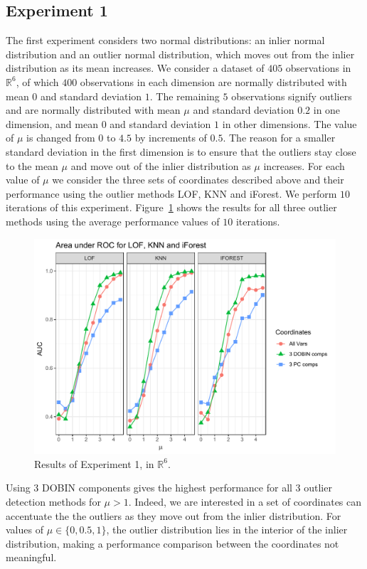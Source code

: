 \documentclass[a4paper,11pt]{article}
\begin{document}
\subsection{Experiment 1}
The first experiment considers two normal distributions: an  inlier normal distribution and an outlier normal distribution, which moves out from the inlier distribution as its mean increases. We consider a dataset of $405$ observations in $\mathbb{R}^6$, of which $400$ observations in each dimension are normally distributed with mean $0$ and standard deviation $1$. The remaining $5$ observations signify outliers and are normally distributed with mean $\mu$ and standard deviation $0.2$ in one dimension, and mean $0$ and standard deviation $1$ in other dimensions. The value of $\mu$ is changed from $0$ to $4.5$ by increments of $0.5$. The reason for a smaller standard deviation in the first dimension is to ensure that the outliers stay close to the mean $\mu$ and move out of the inlier distribution as $\mu$ increases. For each value of $\mu$ we consider the three sets of coordinates described above and their performance using the outlier methods LOF, KNN and iForest.  We perform $10$ iterations of this experiment. Figure~\ref{fig:Exp1} shows the results for all three  outlier methods using the average performance values of $10$ iterations. 

\begin{figure}[!ht]
	\centering
	\includegraphics[scale=0.5]{Exp1.pdf}
	\caption{Results of Experiment 1, in $\mathbb{R}^6$.}
	\label{fig:Exp1}
\end{figure} 

Using $3$ DOBIN components gives the highest performance for all $3$ outlier detection methods for $\mu > 1$.  Indeed, we are interested in a set of coordinates can accentuate the the outliers as they move out from the inlier distribution.  For values of $\mu \in \{0, 0.5, 1\}$,  the outlier distribution lies in the interior of the inlier distribution, making a performance comparison between the coordinates not meaningful.   
\end{document}

